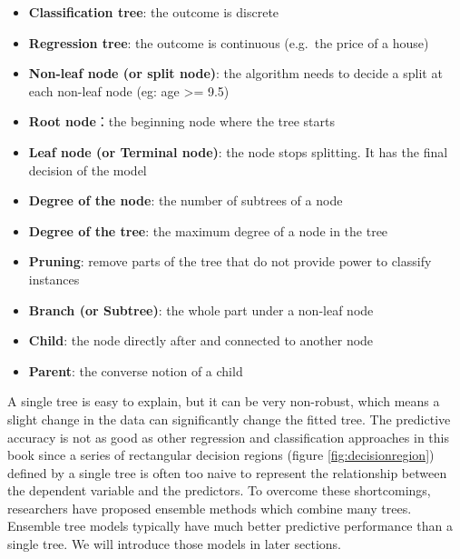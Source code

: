 \documentclass[12pt,]{krantz}
\providecommand{\tightlist}{%
  \setlength{\itemsep}{0pt}\setlength{\parskip}{0pt}}
\begin{document}
\begin{itemize}
\tightlist
\item
  \textbf{Classification tree}: the outcome is discrete
\item
  \textbf{Regression tree}: the outcome is continuous (e.g.~the price of a house)
\item
  \textbf{Non-leaf node (or split node)}: the algorithm needs to decide a split at each non-leaf node (eg: age \textgreater{}= 9.5)
\item
  \textbf{Root node}：the beginning node where the tree starts
\item
  \textbf{Leaf node (or Terminal node)}: the node stops splitting. It has the final decision of the model
\item
  \textbf{Degree of the node}: the number of subtrees of a node
\item
  \textbf{Degree of the tree}: the maximum degree of a node in the tree
\item
  \textbf{Pruning}: remove parts of the tree that do not provide power to classify instances
\item
  \textbf{Branch (or Subtree)}: the whole part under a non-leaf node
\item
  \textbf{Child}: the node directly after and connected to another node
\item
  \textbf{Parent}: the converse notion of a child
\end{itemize}

A single tree is easy to explain, but it can be very non-robust, which means a slight change in the data can significantly change the fitted tree. The predictive accuracy is not as good as other regression and classification approaches in this book since a series of rectangular decision regions (figure \ref{fig:decisionregion}) defined by a single tree is often too naive to represent the relationship between the dependent variable and the predictors. To overcome these shortcomings, researchers have proposed ensemble methods which combine many trees. Ensemble tree models typically have much better predictive performance than a single tree. We will introduce those models in later sections.
\end{document}
